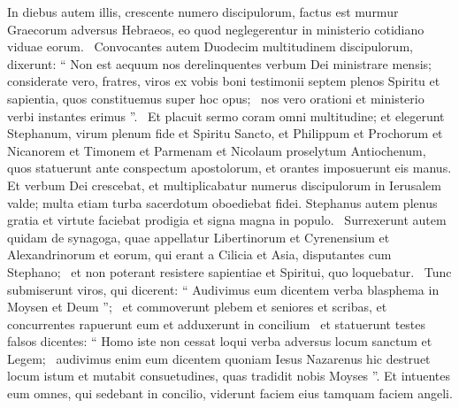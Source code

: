 \begin{biblechapter}
\begin{biblechapter}
\begin{biblechapter}
\begin{biblechapter}
\begin{biblechapter}
\begin{biblechapter}
 \verse In diebus autem illis, crescente numero discipulorum, factus est murmur Graecorum adversus Hebraeos, eo quod neglegerentur in ministerio cotidiano viduae eorum. 
 \verse Convocantes autem Duodecim multitudinem discipulorum, dixerunt: “ Non est aequum nos derelinquentes verbum Dei ministrare mensis; 
 \verse considerate vero, fratres, viros ex vobis boni testimonii septem plenos Spiritu et sapientia, quos constituemus super hoc opus; 
 \verse nos vero orationi et ministerio verbi instantes erimus ”. 
 \verse Et placuit sermo coram omni multitudine; et elegerunt Stephanum, virum plenum fide et Spiritu Sancto, et Philippum et Prochorum et Nicanorem et Timonem et Parmenam et Nicolaum proselytum Antiochenum, 
 \verse quos statuerunt ante conspectum apostolorum, et orantes imposuerunt eis manus.
 \verse Et verbum Dei crescebat, et multiplicabatur numerus discipulorum in Ierusalem valde; multa etiam turba sacerdotum oboediebat fidei.
 \verse Stephanus autem plenus gratia et virtute faciebat prodigia et signa magna in populo. 
 \verse Surrexerunt autem quidam de synagoga, quae appellatur Libertinorum et Cyrenensium et Alexandrinorum et eorum, qui erant a Cilicia et Asia, disputantes cum Stephano; 
 \verse et non poterant resistere sapientiae et Spiritui, quo loquebatur. 
 \verse Tunc submiserunt viros, qui dicerent: “ Audivimus eum dicentem verba blasphema in Moysen et Deum ”; 
 \verse et commoverunt plebem et seniores et scribas, et concurrentes rapuerunt eum et adduxerunt in concilium 
 \verse et statuerunt testes falsos dicentes: “ Homo iste non cessat loqui verba adversus locum sanctum et Legem; 
 \verse audivimus enim eum dicentem quoniam Iesus Nazarenus hic destruet locum istum et mutabit consuetudines, quas tradidit nobis Moyses ”.
 \verse Et intuentes eum omnes, qui sedebant in concilio, viderunt faciem eius tamquam faciem angeli.
 

\end{biblechapter}
\end{biblechapter}
\end{biblechapter}
\end{biblechapter}
\end{biblechapter}
\end{biblechapter}
